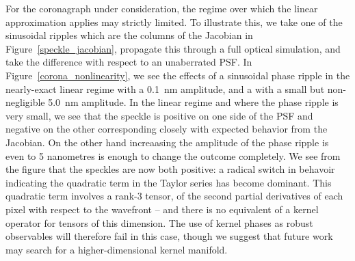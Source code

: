 \documentclass[modern]{aastex63}
\begin{document}



For the coronagraph under consideration, the regime over which the linear approximation applies may strictly limited. To illustrate this, we take one of the sinusoidal ripples which are the columns of the Jacobian in Figure~\ref{speckle_jacobian}, propagate this through a full optical simulation, and take the difference with respect to an unaberrated PSF. In Figure~\ref{corona_nonlinearity}, we see the effects of a sinusoidal phase ripple in the nearly-exact linear regime with a 0.1~nm amplitude, and a with a small but non-negligible 5.0~nm amplitude. In the linear regime and where the phase ripple is very small, we see that the speckle is positive on one side of the PSF and negative on the other corresponding closely with expected behavior from the Jacobian. On the other hand increaasing the amplitude of the phase ripple is even to  5 nanometres is enough to change the outcome completely. We see from the figure that the speckles are now both positive: a radical switch in behavoir indicating the quadratic term in the Taylor series has become dominant. This quadratic term involves a rank-3 tensor, of the second partial derivatives of each pixel with respect to the wavefront -- and there is no equivalent of a kernel operator for tensors of this dimension. The use of kernel phases as robust observables will therefore fail in this case, though we suggest that future work may search for a higher-dimensional kernel manifold. 
\end{document}
